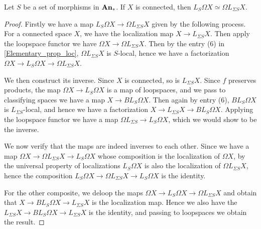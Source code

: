 	\begin{lemma}\label{Commute_loc_loopspace}
		Let $S$ be a set of morphisms in $\mathbf{An}_*$. If $X$ is connected, then $L_S\Omega X\simeq\Omega L_{\Sigma S}X$. 
	\end{lemma}
	\begin{proof}
		Firstly we have a map $L_S\Omega X\to\Omega L_{\Sigma S}X$ given by the following process. For a connected space $X$, we have the localization map $X\to L_{\Sigma S}X$. Then apply the loopspace functor we have $\Omega X\to\Omega L_{\Sigma S}X$. Then by the entry (6) in \cref{Elementary_prop_loc}, $\Omega L_{\Sigma S}X$ is $S$-local, hence we have a factorization $\Omega X\to L_S\Omega X\to\Omega L_{\Sigma S}X$. 

		We then construct its inverse. Since $X$ is connected, so is $L_{\Sigma S}X$. Since $f$ preserves products, the map $\Omega X\to L_S\Omega X$ is a map of loopspaces, and we pass to classifying spaces we have a map $X\to BL_S\Omega X$. Then again by entry (6), $BL_S\Omega X$ is $L_{\Sigma S}$-local, and hence we have a factorization $X\to L_{\Sigma S}X\to BL_S\Omega X$. Applying the loopspace functor we have a map $\Omega L_{\Sigma S}\to L_S\Omega X$, which we would show to be the inverse. 

		We now verify that the maps are indeed inverses to each other. Since we have a map $\Omega X\to\Omega L_{\Sigma S}X\to L_S\Omega X$ whose composition is the localization of $\Omega X$, by the universal property of localizations $L_S\Omega X$ is also the localization of $\Omega L_{\Sigma S}X$, hence the composition $L_S\Omega X\to\Omega L_{\Sigma S}X\to L_S\Omega X$ is the identity. 

		For the other composite, we deloop the maps $\Omega X\to L_S\Omega X\to\Omega L_{\Sigma S}X$ and obtain that $X\to BL_S\Omega X\to L_{\Sigma S}X$ is the localization map. Hence we also have the $L_{\Sigma S}X\to BL_S\Omega X\to L_{\Sigma S}X$ is the identity, and passing to loopspaces we obtain the result. 
	\end{proof}


